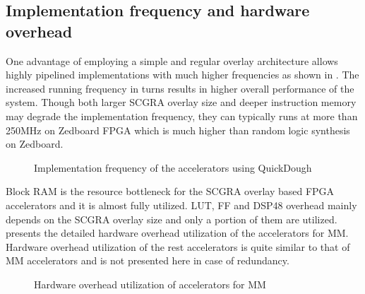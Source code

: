 \subsection{Implementation frequency and hardware overhead} \label{subsec:acc-impl}
One advantage of employing a simple and regular overlay architecture allows highly 
pipelined implementations with much higher frequencies as shown in . 
The increased running frequency in turns results in higher overall 
performance of the system. Though both larger SCGRA overlay size 
and deeper instruction memory may degrade the implementation frequency, they can typically 
runs at more than 250MHz on Zedboard FPGA which is much higher than random logic synthesis on
Zedboard.

\begin{figure}[tb]
\caption{Implementation frequency of the accelerators using QuickDough}
\label{fig:impl-freq}
\end{figure}

Block RAM is the resource bottleneck for the SCGRA overlay based FPGA accelerators and it is
almost fully utilized. LUT, FF and DSP48 overhead mainly depends on the SCGRA overlay size and only
a portion of them are utilized.  presents the detailed hardware overhead
utilization of the accelerators for MM. Hardware overhead utilization of the rest accelerators is
quite similar to that of MM accelerators and is not presented here in case of redundancy.
\begin{figure}[tb]
\caption{Hardware overhead utilization of accelerators for MM}
\label{fig:hw-overhead}
\end{figure}


